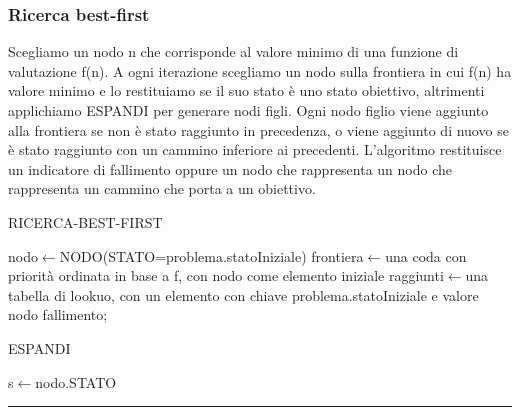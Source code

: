 \documentclass{article}
\begin{document}
\subsubsection{Ricerca best-first}
Scegliamo un nodo n che corrisponde al valore minimo di una funzione di valutazione f(n). A ogni iterazione scegliamo un nodo sulla frontiera in cui f(n) ha valore minimo e lo restituiamo se il suo stato è uno stato obiettivo, altrimenti applichiamo ESPANDI per generare nodi figli. Ogni nodo figlio viene aggiunto alla frontiera se non è stato raggiunto in precedenza, o viene aggiunto di nuovo se è stato raggiunto con un cammino inferiore ai precedenti. L'algoritmo restituisce un indicatore di fallimento oppure un nodo che rappresenta un nodo che rappresenta un cammino che porta a un obiettivo.
\begin{center}
\begin{algorithm}
\caption{RICERCA-BEST-FIRST}
nodo$\leftarrow$NODO(STATO=problema.statoIniziale)\;
frontiera$\leftarrow$una coda con priorità ordinata in base a f, con nodo come elemento iniziale\;
raggiunti$\leftarrow$una tabella di lookuo, con un elemento con chiave problema.statoIniziale e valore nodo\;
\Return fallimento;
\end{algorithm}
\end{center}
\newpage
\begin{center}
\begin{algorithm}
\caption{ESPANDI}
s$\leftarrow$nodo.STATO\;
\end{algorithm}
\end{center}
\par\noindent\rule{\textwidth}{0.4pt}
\newpage
\end{document}
